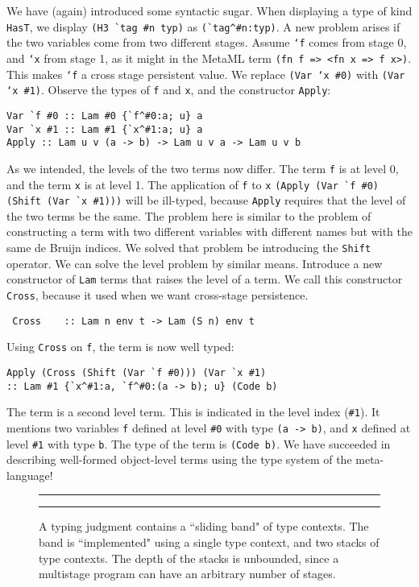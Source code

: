 \documentclass{sigplanconf}
\begin{document}
\noindent
We have (again) introduced some syntactic sugar. When displaying a type
of kind {\tt HasT}, we display \verb+(H3 `tag #n typ)+ as \verb+(`tag^#n:typ)+.
A new problem arises if the two variables come from two different stages. 
Assume {\tt `f} comes from stage 0, and {\tt `x} from
stage 1, as it might in the MetaML term \verb+(fn f => <fn x => f x>)+. This makes {\tt `f} a cross stage persistent
value. We replace {\tt (Var `x \#0)}
with {\tt (Var `x \#1)}. Observe the types of {\tt f} and {\tt x}, and the
constructor {\tt Apply}:
\begin{verbatim}
Var `f #0 :: Lam #0 {`f^#0:a; u} a
Var `x #1 :: Lam #1 {`x^#1:a; u} a
Apply :: Lam u v (a -> b) -> Lam u v a -> Lam u v b
\end{verbatim}
As we intended, the levels of the two terms now differ. The term {\tt f} is at level 0,
and the term {\tt x} is at level 1. The application of {\tt f} to {\tt x}
\verb+(Apply (Var `f #0) (Shift (Var `x #1)))+
will be ill-typed, because {\tt Apply} requires that the level of the two
terms be the same. The problem here is similar to the problem of constructing a term
with two different variables with different names but with the same de Bruijn
indices. We solved that problem be introducing the {\tt Shift} operator.
We can solve the level problem by similar means. Introduce a new constructor
of {\tt Lam} terms that raises the level of a term. We call this constructor
{\tt Cross}, because it used when we want cross-stage persistence.
\begin{verbatim}
 Cross    :: Lam n env t -> Lam (S n) env t
\end{verbatim} 
Using {\tt Cross} on {\tt f}, the term is now well typed:
\begin{verbatim}
Apply (Cross (Shift (Var `f #0))) (Var `x #1)
:: Lam #1 {`x^#1:a, `f^#0:(a -> b); u} (Code b)
\end{verbatim}
The term is a second level term. This is indicated in the level index
(\verb+#1+). It mentions two variables {\tt f} defined at level {\tt \#0} with
type {\tt (a -> b)}, and {\tt x} defined at level {\tt \#1} with type {\tt b}.
The type of the term is {\tt (Code b)}. We have succeeded in describing
well-formed object-level terms using the type system of the meta-language!

\begin{figure}[t]
\hrule
\vspace{1.5ex}
\begin{center}
\end{center}

\caption{A typing judgment contains a ``sliding band" of type contexts. The band
is ``implemented" using a single type context, and two stacks of type contexts.
The depth of the stacks is unbounded, since a multistage program can
have an arbitrary number of stages.} \label{band}

\vspace{1ex}
\hrule
\end{figure}
\end{document}

